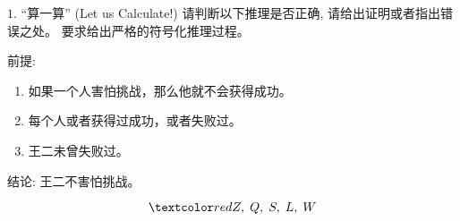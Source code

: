 
\begin{frame}{}
  \begin{exampleblock}{$1.$ ``算一算'' (Let us Calculate!)}	
    请判断以下推理是否正确, 请给出证明或者指出错误之处。
    要求给出严格的符号化推理过程。
    
    前提:
    \begin{enumerate}[(1)]
      \item 如果一个人害怕挑战，那么他就不会获得成功。
      \item 每个人或者获得过成功，或者失败过。
      \item 王二未曾失败过。
    \end{enumerate}

    结论: 王二不害怕挑战。
  \end{exampleblock}

  \pause
  \vspace{0.30cm}
  \[
    \red{Z,\; Q,\; S,\; L,\; W}
  \]
\end{frame}

% 

% 
% 
% 

% 
